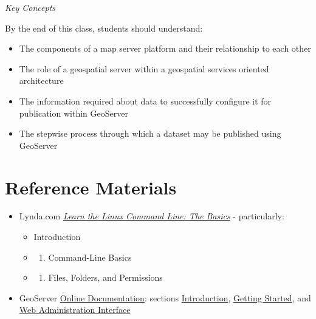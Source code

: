 \documentclass[]{book}
\providecommand{\tightlist}{%
  \setlength{\itemsep}{0pt}\setlength{\parskip}{0pt}}
\begin{document}
\emph{Key Concepts}

By the end of this class, students should understand:

\begin{itemize}
\tightlist
\item
  The components of a map server platform and their relationship to each
  other
\item
  The role of a geospatial server within a geospatial services oriented
  architecture
\item
  The information required about data to successfully configure it for
  publication within GeoServer
\item
  The stepwise process through which a dataset may be published using
  GeoServer
\end{itemize}

\section{Reference Materials}\label{week13-reference}

\begin{itemize}
\tightlist
\item
  Lynda.com
  \href{http://www.lynda.com/Linux-tutorials/Learn-Linux-Command-Line-Basics/435539-2.html?org=unm.edu}{\emph{Learn
  the Linux Command Line: The Basics}} - particularly:

  \begin{itemize}
  \item
    Introduction
  \item
    \begin{enumerate}
    \def\labelenumi{\arabic{enumi}.}
    \tightlist
    \item
      Command-Line Basics
    \end{enumerate}
  \item
    \begin{enumerate}
    \def\labelenumi{\arabic{enumi}.}
    \setcounter{enumi}{1}
    \tightlist
    \item
      Files, Folders, and Permissions
    \end{enumerate}
  \end{itemize}
\item
  GeoServer
  \href{http://docs.geoserver.org/stable/en/user/index.html}{Online
  Documentation}: sections
  \href{http://docs.geoserver.org/stable/en/user/introduction/index.html}{Introduction},
  \href{http://docs.geoserver.org/stable/en/user/gettingstarted/index.html}{Getting
  Started}, and
  \href{http://docs.geoserver.org/stable/en/user/webadmin/index.html}{Web
  Administration Interface}
\end{itemize}
\end{document}
